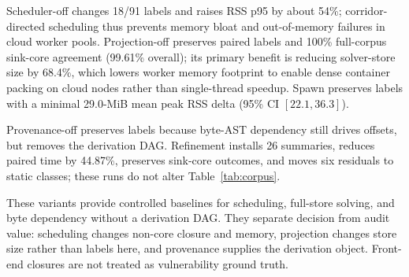 \begin{table}[!t]
\centering
\caption{Paired 91-record mechanism attribution. $\Delta t$ is variant minus full;
brackets give the 95\% paired-bootstrap interval.}
\label{tab:ablation}
\footnotesize
\setlength{\tabcolsep}{2.15pt}
\renewcommand{\arraystretch}{1.08}
\end{table}

Scheduler-off changes 18/91 labels and raises RSS p95 by about 54\%; corridor-directed scheduling thus prevents memory bloat and out-of-memory failures in cloud worker pools. Projection-off preserves paired labels and 100\% full-corpus sink-core agreement (99.61\% overall); its primary benefit is reducing solver-store size by 68.4\%, which lowers worker memory footprint to enable dense container packing on cloud nodes rather than single-thread speedup. Spawn preserves labels with a minimal 29.0-MiB mean peak RSS delta (95\% CI $[22.1,36.3]$).

Provenance-off preserves labels because byte-AST dependency still drives offsets, but removes the derivation DAG. Refinement installs 26 summaries, reduces paired time by 44.87\%, preserves sink-core outcomes, and moves six residuals to static classes; these runs do not alter Table~\ref{tab:corpus}.

These variants provide controlled baselines for scheduling, full-store solving, and byte dependency without a derivation DAG. They separate decision from audit value: scheduling changes non-core closure and memory, projection changes store size rather than labels here, and provenance supplies the derivation object. Front-end closures are not treated as vulnerability ground truth.
